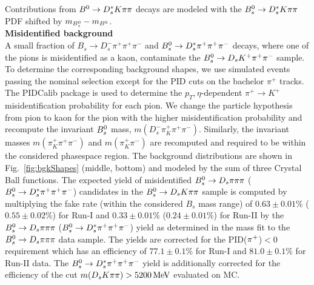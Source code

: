 Contributions from ${{B}^0}\rightarrow D_s^{*}K{\pi}{\pi}$ decays are modeled with the ${{B}^0_{s}}\rightarrow D_s^{*}K{\pi}{\pi}$ PDF  shifted by $m_{{{B}^0_{s}}} - m_{{{B}^0}}$. \\

\noindent\textbf{Misidentified background}  \\
A small fraction of $B_s \to D_s^- \pi^+ \pi^+ \pi^-$ and ${{B}^0_{s}}\rightarrow D_s^{*}\pi^+ \pi^+ \pi^-$ decays, where one of the pions is misidentified as a kaon, contaminate the 
${{B}^0_{s}}\rightarrow D_s K^+ \pi^+ \pi^-$ sample.
To determine the corresponding background shapes, we use simulated events passing the nominal selection
except for the PID cuts on the bachelor $\pi^+$ tracks. 
The \textsf{PIDCalib} package is used to determine the $p_T,\eta$-dependent $\pi^+\rightarrow K^+$ misidentification probability for each pion. 
We change the particle hypothesis from pion to kaon for the pion with the higher misidentification probability and recompute the invariant ${{B}^0_{s}}$ mass, $m(D_s^- \pi^+_K \pi^+ \pi^- )$. 
Similarly, the invariant masses $m(\pi^+_K \pi^+ \pi^- )$ and $m(\pi^+_K \pi^-)$ are recomputed and required to be within the considered phasespace region.
The background distributions are shown in Fig.~\ref{fig:bgkShapes} (middle, bottom) and modeled by the sum of three Crystal Ball functions. 
\newpage
The expected yield of misidentified ${{B}^0_{s}}\rightarrow{\ensuremath{{D}_{s}}}{\ensuremath{\pi}}{\ensuremath{\pi}}{\ensuremath{\pi}}$ (${{B}^0_{s}}\rightarrow D_s^{*}\pi^+ \pi^+ \pi^-$) candidates in the ${{B}^0_{s}}\rightarrow{\ensuremath{{D}_{s}}} K{\pi}{\pi}$ sample is computed 
by multiplying the fake rate (within the considered $B_s$ mass range) of $0.63 \pm 0.01\%$ ($0.55 \pm 0.02\%$) 
for Run-I 
and $0.33 \pm 0.01\%$ ($0.24 \pm 0.01\%$) 
for Run-II
by the ${{B}^0_{s}}\rightarrow{\ensuremath{{D}_{s}}}{\ensuremath{\pi}}{\ensuremath{\pi}}{\ensuremath{\pi}}$ (${{B}^0_{s}}\rightarrow D_s^{*}\pi^+ \pi^+ \pi^-$) yield as determined in the mass fit to the ${{B}^0_{s}}\rightarrow{\ensuremath{{D}_{s}}}{\ensuremath{\pi}}{\ensuremath{\pi}}{\ensuremath{\pi}}$ data sample.
The yields are corrected for the PID(${{\pi}^+}$)$<0$ requirement which has an efficiency of $77.1 \pm 0.1 \%$ for Run-I and $81.0 \pm 0.1 \%$ for Run-II data.  
The ${{B}^0_{s}}\rightarrow D_s^{*}\pi^+ \pi^+ \pi^-$ yield is additionally corrected for the efficiency of the cut $m({{D}_{s}} K{\pi}{\pi})>5200\mathrm{\,Me\kern -0.1em V}$ evaluated on MC.
